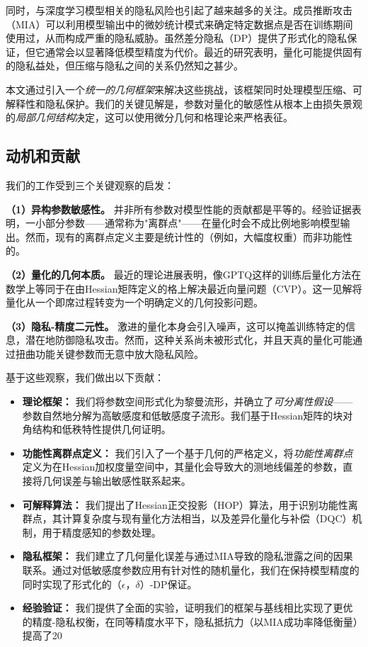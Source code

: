\documentclass[letterpaper,twocolumn,10pt]{article}
\begin{document}
同时，与深度学习模型相关的隐私风险也引起了越来越多的关注。成员推断攻击（MIA）\cite{shokri2017membership}可以利用模型输出中的微妙统计模式来确定特定数据点是否在训练期间使用过，从而构成严重的隐私威胁。虽然差分隐私（DP）\cite{dwork2014algorithmic}提供了形式化的隐私保证，但它通常会以显著降低模型精度为代价。最近的研究表明，量化可能提供固有的隐私益处\cite{yan2023privacy}，但压缩与隐私之间的关系仍然知之甚少。

本文通过引入一个\emph{统一的几何框架}来解决这些挑战，该框架同时处理模型压缩、可解释性和隐私保护。我们的关键见解是，参数对量化的敏感性从根本上由损失景观的\emph{局部几何结构}决定，这可以使用微分几何和格理论来严格表征。

\subsection{动机和贡献}

我们的工作受到三个关键观察的启发：

\textbf{（1）异构参数敏感性。} 并非所有参数对模型性能的贡献都是平等的。经验证据表明，一小部分参数——通常称为"离群点"——在量化时会不成比例地影响模型输出。然而，现有的离群点定义主要是统计性的（例如，大幅度权重）而非功能性的。

\textbf{（2）量化的几何本质。} 最近的理论进展表明，像GPTQ这样的训练后量化方法在数学上等同于在由Hessian矩阵定义的格上解决最近向量问题（CVP）\cite{frantar2022gptq}。这一见解将量化从一个即席过程转变为一个明确定义的几何投影问题。

\textbf{（3）隐私-精度二元性。} 激进的量化本身会引入噪声，这可以掩盖训练特定的信息，潜在地防御隐私攻击。然而，这种关系尚未被形式化，并且天真的量化可能通过扭曲功能关键参数而无意中放大隐私风险。

基于这些观察，我们做出以下贡献：

\begin{itemize}
\item \textbf{理论框架：} 我们将参数空间形式化为黎曼流形，并确立了\emph{可分离性假设}——参数自然地分解为高敏感度和低敏感度子流形。我们基于Hessian矩阵的块对角结构和低秩特性提供几何证明。

\item \textbf{功能性离群点定义：} 我们引入了一个基于几何的严格定义，将\emph{功能性离群点}定义为在Hessian加权度量空间中，其量化会导致大的测地线偏差的参数，直接将几何误差与输出敏感性联系起来。

\item \textbf{可解释算法：} 我们提出了Hessian正交投影（HOP）算法，用于识别功能性离群点，其计算复杂度与现有量化方法相当，以及差异化量化与补偿（DQC）机制，用于精度感知的参数处理。

\item \textbf{隐私框架：} 我们建立了几何量化误差与通过MIA导致的隐私泄露之间的因果联系。通过对低敏感度参数应用有针对性的随机量化，我们在保持模型精度的同时实现了形式化的$（\epsilon，\delta）$-DP保证。

\item \textbf{经验验证：} 我们提供了全面的实验，证明我们的框架与基线相比实现了更优的精度-隐私权衡，在同等精度水平下，隐私抵抗力（以MIA成功率降低衡量）提高了20%
\end{itemize}
\end{document}

